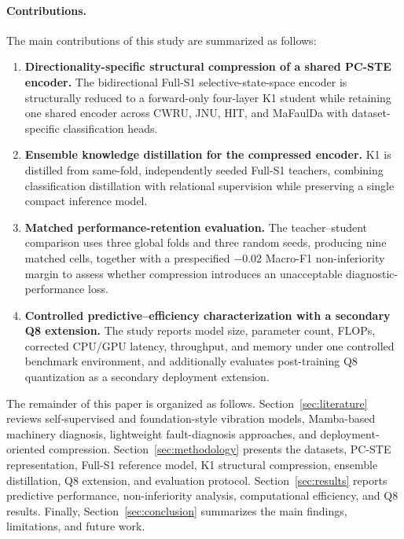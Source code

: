 \paragraph{Contributions.}
The main contributions of this study are summarized as follows:
\begin{enumerate}[leftmargin=*,label=(\roman*)]
    \item \textbf{Directionality-specific structural compression of a shared PC-STE encoder.}
    The bidirectional Full-S1 selective-state-space encoder is structurally reduced to a forward-only four-layer K1 student while retaining one shared encoder across CWRU, JNU, HIT, and MaFaulDa with dataset-specific classification heads.

    \item \textbf{Ensemble knowledge distillation for the compressed encoder.}
    K1 is distilled from same-fold, independently seeded Full-S1 teachers, combining classification distillation with relational supervision while preserving a single compact inference model.

    \item \textbf{Matched performance-retention evaluation.}
    The teacher--student comparison uses three global folds and three random seeds, producing nine matched cells, together with a prespecified $-0.02$ Macro-F1 non-inferiority margin to assess whether compression introduces an unacceptable diagnostic-performance loss.

    \item \textbf{Controlled predictive--efficiency characterization with a secondary Q8 extension.}
    The study reports model size, parameter count, FLOPs, corrected CPU/GPU latency, throughput, and memory under one controlled benchmark environment, and additionally evaluates post-training Q8 quantization as a secondary deployment extension.
\end{enumerate}

The remainder of this paper is organized as follows. Section~\ref{sec:literature} reviews self-supervised and foundation-style vibration models, Mamba-based machinery diagnosis, lightweight fault-diagnosis approaches, and deployment-oriented compression. Section~\ref{sec:methodology} presents the datasets, PC-STE representation, Full-S1 reference model, K1 structural compression, ensemble distillation, Q8 extension, and evaluation protocol. Section~\ref{sec:results} reports predictive performance, non-inferiority analysis, computational efficiency, and Q8 results. Finally, Section~\ref{sec:conclusion} summarizes the main findings, limitations, and future work.
